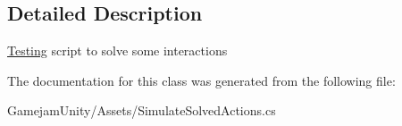 \subsection{Detailed Description}
\mbox{\hyperlink{namespace_dr_evil_1_1_testing}{Testing}} script to solve some interactions 



The documentation for this class was generated from the following file\+:\begin{DoxyCompactItemize}
\item 
Gamejam\+Unity/\+Assets/Simulate\+Solved\+Actions.\+cs\end{DoxyCompactItemize}
